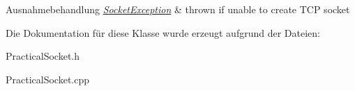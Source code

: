 \begin{DoxyExceptions}{Ausnahmebehandlung}
{\em \hyperlink{classSocketException}{Socket\-Exception}} & thrown if unable to create T\-C\-P socket \\
\hline
\end{DoxyExceptions}


Die Dokumentation für diese Klasse wurde erzeugt aufgrund der Dateien\-:\begin{DoxyCompactItemize}
\item 
Practical\-Socket.\-h\item 
Practical\-Socket.\-cpp\end{DoxyCompactItemize}
